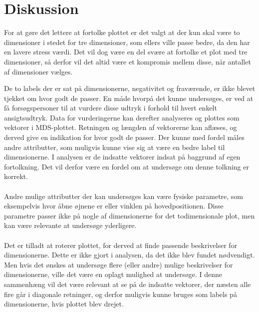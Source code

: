 \section*{Diskussion}
\label{Diskussion}
%
For at gøre det lettere at fortolke plottet er det valgt at der kun skal være to dimensioner i stedet for tre dimensioner, som ellers ville passe bedre, da den har en lavere stress værdi. Det vil dog være en del svære at fortolke et plot med tre dimensioner, så derfor vil det altid være et kompromis mellem disse, når antallet af dimensioner vælges. 

De to labels der er sat på dimensionerne, negativitet og fraværende, er ikke blevet tjekket om hvor godt de passer. En måde hvorpå det kunne undersøges, er ved at få forsøgspersoner til at vurdere disse udtryk i forhold til hvert enkelt ansigtsudtryk. Data for vurderingerne kan derefter analyseres og plottes som vektorer i MDS-plottet. Retningen og længden af vektorerne kan aflæses, og derved give en indikation for hvor godt de passer. Der kunne med fordel måles andre attributter, som muligvis kunne vise sig at være en bedre label til dimensionerne. I analysen er de indsatte vektorer indsat på baggrund af egen fortolkning. Det vil derfor være en fordel om at undersøge om denne tolkning er korrekt. 
\\\\ 
Andre mulige attributter der kan undersøges kan være fysiske parametre, som eksempelvis hvor åbne øjnene er eller vinklen på hovedpositionen. Disse parametre passer ikke på nogle af dimensionerne for det todimensionale plot, men kan være relevante at undersøge yderligere. 
\\\\
Det er tilladt at roterer plottet, for derved at finde passende beskrivelser for dimensionerne. Dette er ikke gjort i analysen, da det ikke blev fundet nødvendigt. Men hvis det ønskes at undersøge flere (eller andre) mulige beskrivelser for dimensionerne, ville det være en oplagt mulighed at undersøge. I denne sammenhæng vil det være relevant at se på de indsatte vektorer, der næsten alle fire går i diagonale retninger, og derfor muligvis kunne bruges som labels på dimensionerne, hvis plottet blev drejet. 